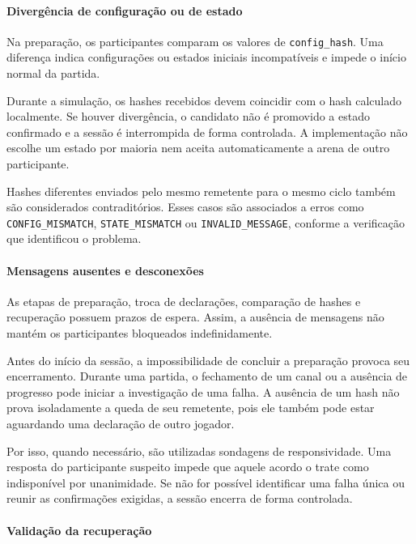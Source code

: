 \documentclass[11pt,a4paper]{article}
\begin{document}
\paragraph{Divergência de configuração ou de estado}

Na preparação, os participantes comparam os valores de \texttt{config\_hash}. Uma diferença indica configurações ou estados iniciais incompatíveis e impede o início normal da partida.

Durante a simulação, os hashes recebidos devem coincidir com o hash calculado localmente. Se houver divergência, o candidato não é promovido a estado confirmado e a sessão é interrompida de forma controlada. A implementação não escolhe um estado por maioria nem aceita automaticamente a arena de outro participante.

Hashes diferentes enviados pelo mesmo remetente para o mesmo ciclo também são considerados contraditórios. Esses casos são associados a erros como \texttt{CONFIG\_MISMATCH}, \texttt{STATE\_MISMATCH} ou \texttt{INVALID\_MESSAGE}, conforme a verificação que identificou o problema.

\paragraph{Mensagens ausentes e desconexões}

As etapas de preparação, troca de declarações, comparação de hashes e recuperação possuem prazos de espera. Assim, a ausência de mensagens não mantém os participantes bloqueados indefinidamente.

Antes do início da sessão, a impossibilidade de concluir a preparação provoca seu encerramento. Durante uma partida, o fechamento de um canal ou a ausência de progresso pode iniciar a investigação de uma falha. A ausência de um hash não prova isoladamente a queda de seu remetente, pois ele também pode estar aguardando uma declaração de outro jogador.

Por isso, quando necessário, são utilizadas sondagens de responsividade. Uma resposta do participante suspeito impede que aquele acordo o trate como indisponível por unanimidade. Se não for possível identificar uma falha única ou reunir as confirmações exigidas, a sessão encerra de forma controlada.

\paragraph{Validação da recuperação}
\end{document}
